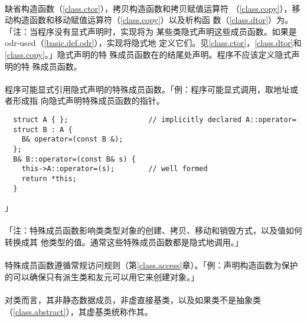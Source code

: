 
\paragraph{}
缺省构造函数（\ref{class.ctor}），拷贝构造函数和拷贝赋值运算符
（\ref{class.copy}），移动构造函数和移动赋值运算符（\ref{class.copy}）以及析构函
数（\ref{class.dtor}）为。「注：当程序没有显式声明时，实现将为
某些类隐式声明这些成员函数。如果是odr-used（\ref{basic.def.odr}），实现将隐式地
定义它们。见\ref{class.ctor}，\ref{class.dtor}和\ref{class.copy}。」隐式声明的特
殊成员函数在的结尾\tm{\}}处声明。程序不应该定义隐式声明的特
殊成员函数。

\paragraph{}
程序可能显式引用隐式声明的特殊成员函数。「例：程序可能显式调用，取地址或者形成指
向隐式声明特殊成员函数的指针。
\begin{lstlisting}
  struct A { };                   // implicitly declared A::operator=
  struct B : A {
    B& operator=(const B &);
  };
  B& B::operator=(const B& s) {
    this->A::operator=(s);        // well formed
    return *this;
  }
\end{lstlisting}」

\paragraph{}
「注：特殊成员函数影响类类型对象的创建、拷贝、移动和销毁方式，以及值如何转换成其
他类型的值。通常这些特殊成员函数都是隐式地调用。」

\paragraph{}
特殊成员函数遵循常规访问规则（第\ref{class.access}章）。「例：声明构造函数为保护
的可以确保只有派生类和友元可以用它来创建对象。」

\paragraph{}
对类而言，其非静态数据成员，非虚直接基类，以及如果类不是抽象类
（\ref{class.abstract}），其虚基类统称作其。

